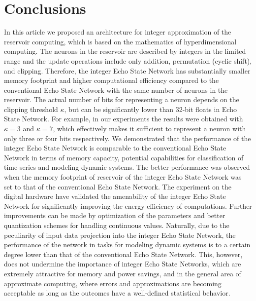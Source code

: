 \section{Conclusions}
\label{sect:conclusions}

In this article we  proposed an architecture for integer approximation of the
reservoir computing, which is based on the  mathematics of  hyperdimensional
computing. The neurons in the reservoir are described by integers in the limited range and the
update operations include only addition, permutation (cyclic shift), and clipping.  Therefore, the integer Echo State Network
has substantially smaller memory footprint and higher computational efficiency
compared to the conventional Echo State Network with the same number of neurons in
the reservoir. The actual number of bits for representing a neuron depends on
the clipping threshold $\kappa$, but can be significantly lower than 32-bit floats in Echo State Network. For example, in our experiments the results were
obtained with $\kappa=3$ and $\kappa=7$, which effectively makes it sufficient to represent a
neuron with only three or four bits respectively. We demonstrated that the performance of the integer Echo State Network is
comparable to the conventional Echo State Network in terms of memory capacity, potential capabilities for classification of time-series and modeling dynamic systems. 
The better performance was observed when the memory footprint of reservoir of the integer Echo State Network was set to that of the conventional Echo State Network.
The experiment on the digital hardware have validated the amenability of the integer Echo State Network for significantly improving the energy efficiency of computations. 
Further improvements can be made by optimization of the parameters and better quantization schemes for handling continuous values.
 Naturally, due to the
peculiarity of input data projection into the integer Echo State Network, the performance of the
network 
in tasks for modeling dynamic systems
is to a certain degree lower than that of the  conventional Echo State Network. This,
however, does not undermine the importance of integer Echo State Networks,  which are  extremely
attractive for memory and power savings, and in the general
area of approximate computing,  where errors and  approximations are becoming
acceptable as  long as the outcomes have a well-defined statistical behavior. 


